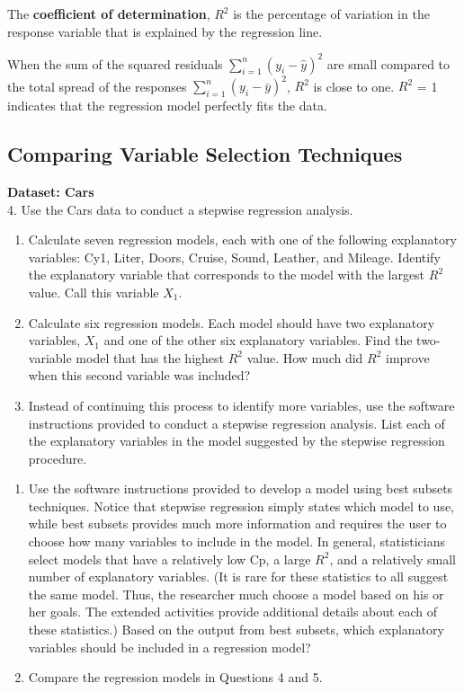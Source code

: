 \documentclass[
]{report}
\theoremstyle{definition}
\theoremstyle{definition}
\theoremstyle{definition}
\theoremstyle{definition}
\theoremstyle{remark}
\begin{document}
The \textbf{coefficient of determination}, \textbf{\(R^2\)} is the percentage of variation in the response variable that is explained by the regression line.

When the sum of the squared residuals \({\sum_{i=1}^{n}({y}_i - \hat{y})^2}\) are small compared to the total spread of the responses \({\sum_{i=1}^{n}({y}_i - \bar{y})^2}\), \(R^2\) is close to one. \(R^2\) = 1 indicates that the regression model perfectly fits the data.

\hypertarget{comparing-variable-selection-techniques}{%
\subsection*{Comparing Variable Selection Techniques}\label{comparing-variable-selection-techniques}}

\textbf{Dataset: Cars}\\
4. Use the Cars data to conduct a stepwise regression analysis.

\begin{enumerate}
\def\labelenumi{\alph{enumi}.}
\item
  Calculate seven regression models, each with one of the following explanatory variables: Cy1, Liter, Doors, Cruise, Sound, Leather, and Mileage. Identify the explanatory variable that corresponds to the model with the largest \(R^2\) value. Call this variable \(X_1\).
\item
  Calculate six regression models. Each model should have two explanatory variables, \(X_1\) and one of the other six explanatory variables. Find the two-variable model that has the highest \(R^2\) value. How much did \(R^2\) improve when this second variable was included?
\item
  Instead of continuing this process to identify more variables, use the software instructions provided to conduct a stepwise regression analysis. List each of the explanatory variables in the model suggested by the stepwise regression procedure.
\end{enumerate}

\begin{enumerate}
\def\labelenumi{\arabic{enumi}.}
\setcounter{enumi}{4}
\item
  Use the software instructions provided to develop a model using best subsets techniques. Notice that stepwise regression simply states which model to use, while best subsets provides much more information and requires the user to choose how many variables to include in the model. In general, statisticians select models that have a relatively low Cp, a large \(R^2\), and a relatively small number of explanatory variables. (It is rare for these statistics to all suggest the same model. Thus, the researcher much choose a model based on his or her goals. The extended activities provide additional details
  about each of these statistics.) Based on the output from best subsets, which explanatory variables should be included in a regression model?
\item
  Compare the regression models in Questions 4 and 5.
\end{enumerate}
\end{document}
